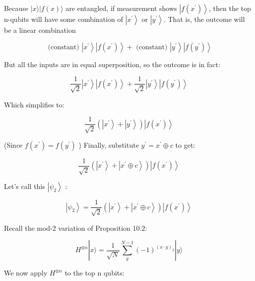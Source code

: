 \documentclass[main.tex]{subfiles}
\begin{document}
    Because $|x\rangle|f(x)\rangle$ are entangled, if measurement shows $\left|f\left(x^{\prime}\right)\right\rangle$, then the top $\mathrm{n}$-qubits will have some combination of $\left|x^{\prime}\right\rangle$ or $\left|y^{\prime}\right\rangle$. That is, the outcome will be a linear combination
    
    $$
    \text { (constant) }\left|x^{\prime}\right\rangle\left|f\left(x^{\prime}\right)\right\rangle+\text { (constant) }\left|y^{\prime}\right\rangle\left|f\left(y^{\prime}\right)\right\rangle
    $$
    
    But all the inputs are in equal superposition, so the outcome is in fact:
    
    $$
    \frac{1}{\sqrt{2}}\left|x^{\prime}\right\rangle\left|f\left(x^{\prime}\right)\right\rangle+\frac{1}{\sqrt{2}}\left|y^{\prime}\right\rangle\left|f\left(y^{\prime}\right)\right\rangle
    $$
    
    Which simplifies to:
    
    $$
    \frac{1}{\sqrt{2}}\left(\left|x^{\prime}\right\rangle+\left|y^{\prime}\right\rangle\right)\left|f\left(x^{\prime}\right)\right\rangle
    $$
    
    (Since $f\left(x^{\prime}\right)=f\left(y^{\prime}\right)$ ) Finally, substitute $y^{\prime}=x^{\prime} \oplus c$ to get:
    
    $$
    \frac{1}{\sqrt{2}}\left(\left|x^{\prime}\right\rangle+\left|x^{\prime} \oplus c\right\rangle\right)\left|f\left(x^{\prime}\right)\right\rangle
    $$
    
    Let's call this $\left|\psi_{2}\right\rangle$ :
    
    $$
    \left|\psi_{2}\right\rangle=\frac{1}{\sqrt{2}}\left(\left|x^{\prime}\right\rangle+\left|x^{\prime} \oplus c\right\rangle\right)\left|f\left(x^{\prime}\right)\right\rangle
    $$
    
    Recall the mod-2 variation of Proposition 10.2:
    
    $$
    H^{\otimes n}|x\rangle=\frac{1}{\sqrt{N}} \sum_{y}^{N-1}(-1)^{(x \cdot y)_{2}}|y\rangle
    $$
    
    We now apply $H^{\otimes n}$ to the top n qubits:
    
\end{document}
